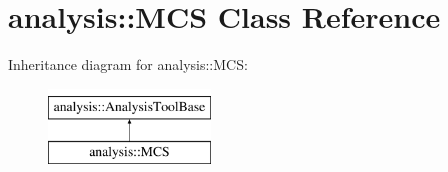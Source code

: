 \hypertarget{classanalysis_1_1MCS}{}\section{analysis\+:\+:M\+CS Class Reference}
\label{classanalysis_1_1MCS}
Inheritance diagram for analysis\+:\+:M\+CS\+:\begin{figure}[H]
\begin{center}
\leavevmode
\includegraphics[height=2.000000cm]{classanalysis_1_1MCS}
\end{center}
\end{figure}

